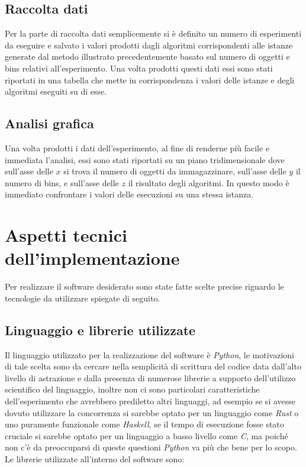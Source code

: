 \subsection{Raccolta dati}
Per la parte di raccolta dati semplicemente si è definito un numero di esperimenti da eseguire e salvato i valori prodotti dagli algoritmi corrispondenti
alle istanze generate dal metodo illustrato precedentemente basato sul numero di oggetti e bins relativi all'esperimento. Una volta prodotti questi dati
essi sono stati riportati in una tabella che mette in corrispondenza i valori delle istanze e degli algoritmi eseguiti su di esse.


\subsection{Analisi grafica}
Una volta prodotti i dati dell'esperimento, al fine di renderne più facile e immediata l'analisi, essi sono stati riportati su un piano tridimensionale 
dove sull'asse delle $ x $ si trova il numero di oggetti da immagazzinare, sull'asse delle $ y $ il numero di bins, e sull'asse delle $ z $
il risultato degli algoritmi. In questo modo è immediato confrontare i valori delle esecuzioni su una stessa istanza.


\section{Aspetti tecnici dell'implementazione}
Per realizzare il software desiderato sono state fatte scelte precise riguardo le tecnologie da utilizzare spiegate di seguito.

\subsection{Linguaggio e librerie utilizzate}
Il linguaggio utilizzato per la realizzazione del software è \textit{Python}, le motivazioni di tale scelta sono da cercare nella semplicità di scrittura 
del codice data dall'alto livello di astrazione e dalla presenza di numerose librerie a supporto dell'utilizzo scientifico del linguaggio, inoltre
non ci sono particolari caratteristiche dell'esperimento che avrebbero prediletto altri linguaggi, ad esempio se si avesse dovuto utilizzare la concorrenza 
si sarebbe optato per un linguaggio come \textit{Rust} o uno puramente funzionale come \textit{Haskell}, se il tempo di esecuzione fosse stato cruciale si sarebbe
optato per un linguaggio a basso livello come \textit{C}, ma poiché non c'è da preoccuparsi di queste questioni \textit{Python} va più che bene per lo
scopo.\\
Le librerie utilizzate all'interno del software sono:

